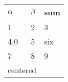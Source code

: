 \begin{tabular}{lcl}
\toprule 
$\alpha$ & $\beta$ & sum \\
\midrule 
1 & 2 & 3 \\
\hline 
4.0 & 5 & six \\
7 & 8 & 9 \\
\cmidrule{1-2} \multicolumn{2}{c}{centered} \\
\bottomrule 
\end{tabular}
